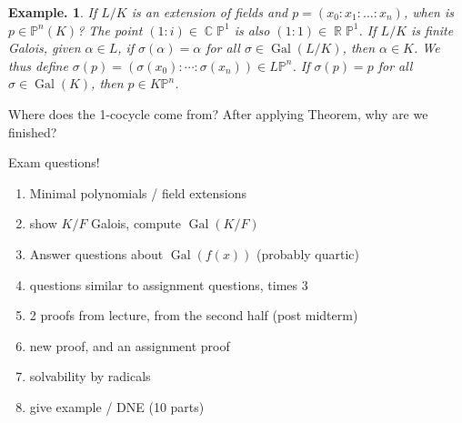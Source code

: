 \documentclass[11pt, a4paper]{memoir}
\DeclareMathOperator{\R}{{\mathbb{R}}}
\DeclareMathOperator{\C}{{\mathbb{C}}}
\theoremstyle{change}
\theoremstyle{plain}
\theoremstyle{nonumberplain}
\newtheorem{example}{Example.}
\DeclareMathOperator{\Gal}{Gal}
\numberwithin{equation}{section}
\begin{document}
\begin{example}
    If $L/K$ is an extension of fields and $p=(x_0:x_1:\ldots:x_n)$, when is $p\in\mathbb{P}^n(K)$?
    The point $(1:i)\in\C\mathbb{P}^1$ is also $(1:1)\in\R\mathbb{P}^1$.
    If $L/K$ is finite Galois, given $\alpha\in L$, if $\sigma(\alpha)=\alpha$ for all $\sigma\in\Gal(L/K)$, then $\alpha\in K$.
    We thus define $\sigma(p)=(\sigma(x_0):\cdots:\sigma(x_n))\in L\mathbb{P}^n$.
    If $\sigma(p)=p$ for all $\sigma\in\Gal(K)$, then $p\in K\mathbb{P}^n$.
\end{example}
Where does the 1-cocycle come from?
After applying Theorem, why are we finished?

Exam questions!
\begin{enumerate}
    \item Minimal polynomials / field extensions
    \item show $K/F$ Galois, compute $\Gal(K/F)$
    \item Answer questions about $\Gal(f(x))$ (probably quartic)
    \item questions similar to assignment questions, times 3
    \item 2 proofs from lecture, from the second half (post midterm)
    \item new proof, and an assignment proof
    \item solvability by radicals
    \item give example / DNE (10 parts)
\end{enumerate}
\end{document}
